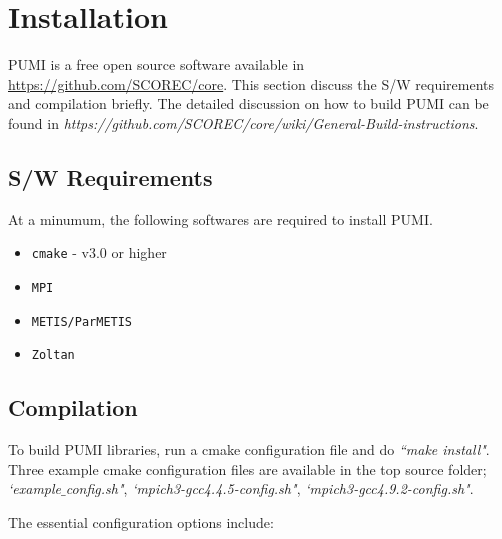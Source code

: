 \section{Installation}

PUMI is a free open source software available in \url{https://github.com/SCOREC/core}. 
This section discuss the S/W requirements and compilation briefly. 
The detailed discussion on how to build PUMI can be found in \emph{https://github.com/SCOREC/core/wiki/General-Build-instructions}.

\subsection{S/W Requirements}

At a minumum, the following softwares are required to install PUMI.
\begin{itemize}
\item \texttt{cmake} - v3.0 or higher
\item \texttt{MPI}
\item \texttt{METIS/ParMETIS} ~\cite{ParmetisOverviewArticle2002}
\item \texttt{Zoltan}~\cite{ZoltanOverviewArticle2002}
\end{itemize}

\subsection{Compilation}

To build PUMI libraries, run a cmake configuration file and do \emph{``make install"}. Three example cmake configuration files are available in the top source folder; \emph{`example$\_$config.sh"},  \emph{`mpich3-gcc4.4.5-config.sh"},  \emph{`mpich3-gcc4.9.2-config.sh"}.

The essential configuration options include: 

